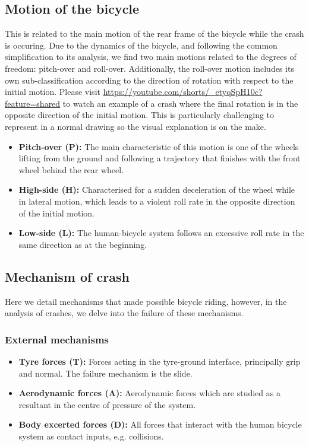 \documentclass{article}
\begin{document}
\subsection{Motion of the bicycle}

This is related to the main motion of the rear frame of the bicycle while the crash is occuring.
%
Due to the dynamics of the bicycle, and following the common simplification to its analysis, we find two main motions related to the degrees of freedom: pitch-over and roll-over.
%
Additionally, the roll-over motion includes its own sub-classification according to the direction of rotation with respect to the initial motion.
% 
Please visit \url{https://youtube.com/shorts/_etyqSpH10c?feature=shared} to watch an example of a crash where the final rotation is in the opposite direction of the initial motion.
%
This is particularly challenging to represent in a normal drawing so the visual explanation is on the make.

\begin{itemize}
    \item \textbf{Pitch-over (P):} The main characteristic of this motion is one of the wheels lifting from the ground and following a trajectory that finishes with the front wheel behind the rear wheel.
    \item \textbf{High-side (H):} Characterised for a sudden deceleration of the wheel while in lateral motion, which leads to a violent roll rate in the opposite direction of the initial motion.
    \item \textbf{Low-side (L):} The human-bicycle system follows an excessive roll rate in the same direction as at the beginning.
\end{itemize}



\subsection{Mechanism of crash}

Here we detail mechanisms that made possible bicycle riding, however, in the analysis of crashes, we delve into the failure of these mechanisms.

\subsubsection{External mechanisms}
\begin{itemize}
    \item \textbf{Tyre forces (T):} Forces acting in the tyre-ground interface, principally grip and normal. The failure mechanism is the slide.
    \item \textbf{Aerodynamic forces (A):} Aerodynamic forces which are studied as a resultant in the centre of pressure of the system.
    \item \textbf{Body excerted forces (D):} All forces that interact with the human bicycle system as contact inputs, e.g. collisions.
\end{itemize}
\end{document}
